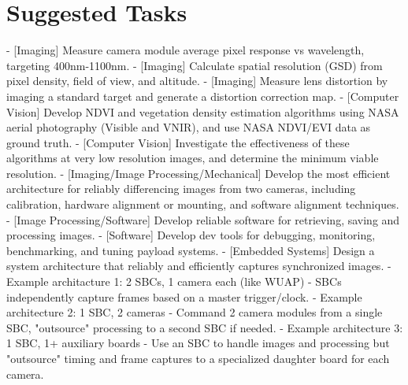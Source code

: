\documentclass[conference]{IEEEtran} %
\begin{document}
\section{Suggested Tasks}

- [Imaging] Measure camera module average pixel response vs wavelength, targeting 400nm-1100nm.
- [Imaging] Calculate spatial resolution (GSD) from pixel density, field of view, and altitude.
- [Imaging] Measure lens distortion by imaging a standard target and generate a distortion correction map.
- [Computer Vision] Develop NDVI and vegetation density estimation algorithms using NASA aerial photography (Visible and VNIR), and use NASA NDVI/EVI data as ground truth.
- [Computer Vision] Investigate the effectiveness of these algorithms at very low resolution images, and determine the minimum viable resolution.
- [Imaging/Image Processing/Mechanical] Develop the most efficient architecture for reliably differencing images from two cameras, including calibration, hardware alignment or mounting, and software alignment techniques.
- [Image Processing/Software] Develop reliable software for retrieving, saving and processing images.
- [Software] Develop dev tools for debugging, monitoring, benchmarking, and tuning payload systems.
- [Embedded Systems] Design a system architecture that reliably and efficiently captures synchronized images.
    - Example architacture 1: 2 SBCs, 1 camera each (like WUAP) - SBCs independently capture frames based on a master trigger/clock.
    - Example architecture 2: 1 SBC, 2 cameras - Command 2 camera modules from a single SBC, "outsource" processing to a second SBC if needed.
    - Example architecture 3: 1 SBC, 1+ auxiliary boards - Use an SBC to handle images and processing but "outsource" timing and frame captures to a specialized daughter board for each camera.
\end{document}
